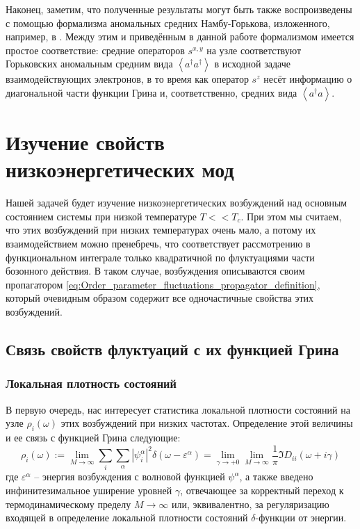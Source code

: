 Наконец, заметим, что полученные результаты могут быть также воспроизведены с помощью формализма аномальных средних Намбу-Горькова, изложенного, например, в \cite{AGD}. Между этим и приведённым в данной работе формализмом имеется простое соответствие: средние операторов $s^{x,y}$ на узле соответствуют Горьковских аномальным средним вида $\left\langle a^\dagger a^\dagger \right\rangle$ в исходной задаче взаимодействующих электронов, в то время как оператор $s^z$ несёт информацию о диагональной части функции Грина и, соответственно, средних вида $\left\langle a^\dagger a\right\rangle$. 






\section{Изучение свойств низкоэнергетических мод}
Нашей задачей будет изучение низкоэнергетических возбуждений над основным состоянием системы при низкой температуре $T << T_c$. При этом мы считаем, что этих возбуждений при низких температурах очень мало, а потому их взаимодействием можно пренебречь, что соответствует рассмотрению в функциональном интеграле только квадратичной по флуктуациями части бозонного действия. В таком случае, возбуждения  описываются своим пропагатором \eqref{eq:Order_parameter_fluctuations_propagator_definition}, который очевидным образом содержит все одночастичные свойства этих возбуждений.

\subsection{Связь свойств флуктуаций с их функцией Грина}
\subsubsection{Локальная плотность состояний}
В первую очередь, нас интересует статистика локальной плотности состояний на узле $\rho_i(\omega)$ этих возбуждений при низких частотах. Определение этой величины и ее связь с функцией Грина следующие:
\begin{equation}
	\label{eq:LDoS_through_GF}
	\rho_i(\omega)  := \lim_{M \rightarrow \infty} \sum_i \sum_\alpha \left| \psi^\alpha_i \right|^2 \delta(\omega - \varepsilon^\alpha) =  \lim_{\gamma \rightarrow +0} \lim_{M \rightarrow \infty} \frac{1}{\pi} \Im D_{ii}(\omega + i \gamma)
\end{equation}
где $\varepsilon^\alpha$ -- энергия возбуждения с волновой функцией $\psi^\alpha$, а также введено инфинитезимальное уширение уровней $\gamma$, отвечающее за корректный переход к термодинамическому пределу $M \rightarrow \infty$ или, эквивалентно, за регуляризацию входящей в определение локальной плотности состояний $\delta$-функции от энергии.


